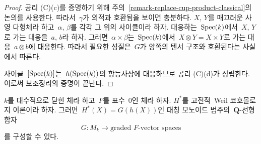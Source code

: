 \begin{proof}
\medskip\noindent
공리 (C)(c)를 증명하기 위해 주의\ 
\ref{remark-replace-cup-product-classical}의 논의를 사용한다.
따라서\  $\gamma$가 외적과 호환됨을 보이면 충분하다.
$X$, $Y$를 매끄러운 사영 다형체라 하고\  $\alpha$, $\beta$를 각각 그
위의 사이클이라 하자. 대응하는\  $\mathop{\mathrm{Spec}}(k)$에서\  $X$, $Y$로 가는 대응을\ 
$a$, $b$라 하자. 그러면\  $\alpha \times \beta$는\ 
$\mathop{\mathrm{Spec}}(k)$에서\  $X \otimes Y = X \times Y$로 가는 대응\ 
$a \otimes b$에 대응한다. 따라서 필요한 성질은\  $G$가 양쪽의 텐서
구조와 호환된다는 사실에서 따른다.

\medskip\noindent
사이클\  $[\mathop{\mathrm{Spec}}(k)]$는\  $h(\mathop{\mathrm{Spec}}(k))$의 항등사상에 대응하므로
공리 (C)(d)가 성립한다. 이로써 보조정리의 증명이 끝난다.
\end{proof}
\begin{lemma}
\label{lemma-from-weil-to-functor-classical}
$k$를 대수적으로 닫힌 체라 하고\  $F$를 표수\  $0$인 체라 하자.
$H^*$를 고전적\  Weil 코호몰로지 이론이라 하자. 그러면\ 
$H^*(X) = G(h(X))$인 대칭 모노이드 범주의\  $\mathbf{Q}$-선형 함자
$$
G : M_k \longrightarrow \text{graded }F\text{-vector spaces}
$$
를 구성할 수 있다.
\end{lemma}

